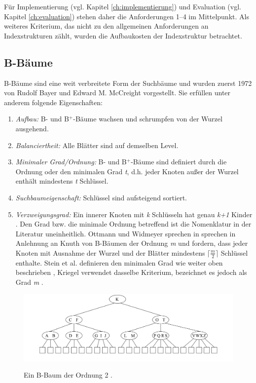 Für Implementierung (vgl. Kapitel \ref{ch:implementierung}) und Evaluation (vgl. Kapitel \ref{ch:evaluation}) stehen daher die Anforderungen 1--4 im Mittelpunkt. Als weiteres Kriterium, das nicht zu den allgemeinen Anforderungen an Indexstrukturen zählt, wurden die Aufbaukosten der Indexstruktur betrachtet. 
\subsection{B-Bäume}\label{sec:b-bäume}
B-Bäume sind eine weit verbreitete Form der Suchbäume und wurden zuerst 1972 von Rudolf Bayer und Edward M. McCreight vorgestellt. Sie erfüllen unter anderem folgende Eigenschaften:  
\begin{enumerate}
\setlength{\itemsep}{20pt}
	\item \textit{Aufbau:} B- und B$^+$-Bäume wachsen und schrumpfen von der Wurzel ausgehend.
	\item \textit{Balanciertheit:} Alle Blätter sind auf demselben Level. 
	\item \textit{Minimaler Grad/Ordnung:} B- und B$^+$-Bäume sind definiert durch die Ordnung oder den minimalen Grad \textit{t}, d.h. jeder Knoten außer der Wurzel enthält mindestens \textit{t} Schlüssel. 
	\item \textit{Suchbaumeigenschaft:} Schlüssel sind aufsteigend sortiert.
	\item \textit{Verzweigungsgrad:} Ein innerer Knoten mit \textit{k} Schlüsseln hat genau \textit{k+1} Kinder \cite{Ottmann2012}. Den Grad bzw. die minimale Ordnung betreffend ist die Nomenklatur in der Literatur uneinheitlich. Ottmann und Widmeyer \cite{Ottmann2012} sprechen in sprechen in Anlehnung an Knuth \cite{Knuth1999} von B-Bäumen der Ordnung \textit{m} und fordern, dass jeder Knoten mit Ausnahme der Wurzel und der Blätter mindestens $\lceil\frac{m}{2}\rceil$ Schlüssel enthalte. Stein et al. definieren den minimalen Grad wie weiter oben beschrieben \cite{Stein2009}, Kriegel verwendet dasselbe Kriterium, bezeichnet es jedoch als Grad \textit{m} \cite{Kriegel1994--2013}.
\end{enumerate}
\begin{figure}[hpbt]
  \centering
  \includegraphics[width=1.0\textwidth]{pictures/b-baum.png}\\
  \caption[Ein B-Baum der Ordnung 2]{Ein B-Baum der Ordnung 2 \cite{Kriegel1994--2013}.}\label{fig:pic3}
\end{figure}
